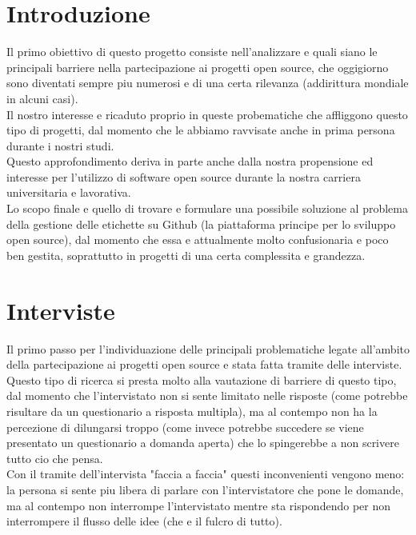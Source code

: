 \documentclass[12pt]{article} %
\begin{document}
\section{Introduzione}
Il primo obiettivo di questo progetto consiste nell'analizzare e quali siano le principali barriere nella partecipazione ai progetti open source, che oggigiorno sono diventati sempre piu numerosi e di una certa rilevanza (addirittura mondiale in alcuni casi).\\
Il nostro interesse e ricaduto proprio in queste probematiche che affliggono questo tipo di progetti, dal momento che le abbiamo ravvisate anche in prima persona durante i nostri studi. \\
Questo approfondimento deriva in parte anche dalla nostra propensione ed interesse per l'utilizzo di software open source durante la nostra carriera universitaria e lavorativa.\\
Lo scopo finale e quello di trovare e formulare una possibile soluzione al problema della gestione delle etichette su Github (la piattaforma principe per lo sviluppo open source), dal momento che essa e attualmente molto confusionaria e poco ben gestita, soprattutto in progetti di una certa complessita e grandezza.

\section{Interviste}
Il primo passo per l'individuazione delle principali problematiche legate all'ambito della partecipazione ai progetti open source e stata fatta tramite delle interviste. Questo tipo di ricerca si presta molto alla vautazione di barriere di questo tipo, dal momento che l'intervistato non si sente limitato nelle risposte (come potrebbe risultare da un questionario a risposta multipla), ma al contempo non ha la percezione di dilungarsi troppo (come invece potrebbe succedere se viene presentato un questionario a domanda aperta) che lo spingerebbe a non scrivere tutto cio che pensa. \\
Con il tramite dell'intervista "faccia a faccia" questi inconvenienti vengono meno: la persona si sente piu libera di parlare con l'intervistatore che pone le domande, ma al contempo non interrompe l'intervistato mentre sta rispondendo per non interrompere il flusso delle idee (che e il fulcro di tutto).\\
\end{document}
